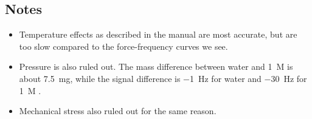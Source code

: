 \subsection*{Notes}
\begin{itemize}
  \item Temperature effects as described in the manual are most accurate,
        but are too slow compared to the force-frequency curves we see.
  \item Pressure is also ruled out. The mass difference between water and
        \SI{1}{M}  is about \SI{7.5}{\milli\gram}, while the signal
        difference is \SI{-1}{\hertz} for water and \SI{-30}{\hertz} for
        \SI{1}{M} .
  \item Mechanical stress also ruled out for the same reason.
\end{itemize}




